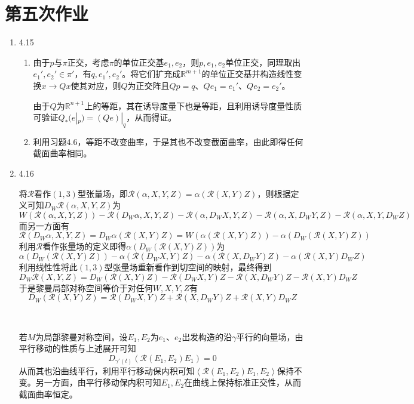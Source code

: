 \documentclass[a4paper,UTF8,fontset=windows,10pt]{ctexart}
\newcommand*{\br}{\mathbb{R}}
\newcommand*{\rc}{\mathcal{R}}
\begin{document}
\section{第五次作业}
\begin{enumerate}
    \item 4.15
    \begin{enumerate}[(1)]
        \item 由于$p$与$\pi$正交，考虑$\pi$的单位正交基$e_1,e_2$，则$p,e_1,e_2$单位正交，同理取出$e_1',e_2'\in\pi'$，有$q,e_1',e_2'$。将它们扩充成$\br^{m+1}$的单位正交基并构造线性变换$x\to Qx$使其对应，则$Q$为正交阵且$Qp=q$、$Qe_1=e_1'$、$Qe_2=e_2'$。
        
        由于$Q$为$\br^{n+1}$上的等距，其在诱导度量下也是等距，且利用诱导度量性质可验证$Q_*(e|_p)=(Qe)|_q$，从而得证。
    
        \item 利用习题4.6，等距不改变曲率，于是其也不改变截面曲率，由此即得任何截面曲率相同。
    \end{enumerate}
    
    \item 4.16
    
    将$\rc$看作$(1,3)$型张量场，即$\rc(\alpha,X,Y,Z)=\alpha(\rc(X,Y)Z)$，则根据定义可知$D_W\rc(\alpha,X,Y,Z)$为
    $$W(\rc(\alpha,X,Y,Z))-\rc(D_W\alpha,X,Y,Z)-\rc(\alpha,D_WX,Y,Z)-\rc(\alpha,X,D_WY,Z)-\rc(\alpha,X,Y,D_WZ)$$
    而另一方面有
    $$\rc(D_W\alpha,X,Y,Z)=D_W\alpha(\rc(X,Y)Z)=W(\alpha(\rc(X,Y)Z))-\alpha(D_W(\rc(X,Y)Z))$$
    利用$\rc$看作张量场的定义即得$\alpha(D_W(\rc(X,Y)Z))$为
    $$\alpha(D_W(\rc(X,Y)Z))-\alpha(\rc(D_WX,Y)Z)-\alpha(\rc(X,D_WY)Z)-\alpha(\rc(X,Y)D_WZ)$$
    利用线性性将此$(1,3)$型张量场重新看作到切空间的映射，最终得到
    $$D_W\rc(X,Y,Z)=D_W(\rc(X,Y)Z)-\rc(D_WX,Y)Z-\rc(X,D_WY)Z-\rc(X,Y)D_WZ$$
    于是黎曼局部对称空间等价于对任何$W,X,Y,Z$有
    $$D_W(\rc(X,Y)Z)=\rc(D_WX,Y)Z+\rc(X,D_WY)Z+\rc(X,Y)D_WZ$$
    
    \
    
    若$M$为局部黎曼对称空间，设$E_1,E_2$为$e_1$、$e_2$出发构造的沿$\gamma$平行的向量场，由平行移动的性质与上述展开可知
    $$D_{\gamma'(t)}(\rc(E_1,E_2)E_1)=0$$
    从而其也沿曲线平行，利用平行移动保内积可知$\left<\rc(E_1,E_2)E_1,E_2\right>$保持不变。另一方面，由平行移动保内积可知$E_1,E_2$在曲线上保持标准正交性，从而截面曲率恒定。
    
    \
    

\end{enumerate}
\end{document}

